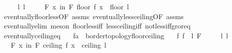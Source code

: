 \begin{isabellebody}
\ \ \ \ \ l{\isacharcolon}{\kern0pt}\ {\isachardoublequoteopen}l\ {\isasymnotin}\ {\isasymint}{\isachardoublequoteclose}\isanewline
\ \ \ {\isachardoublequoteopen}{\isasymforall}\isactrlsub F\ x\ in\ F{\isachardot}{\kern0pt}\ floor\ {\isacharparenleft}{\kern0pt}f\ x{\isacharparenright}{\kern0pt}\ {\isacharequal}{\kern0pt}\ floor\ l{\isachardoublequoteclose}\isanewline
%
\isadelimproof
\ \ %
\endisadelimproof
%
\isatagproof
{}\isamarkupfalse%
\ eventually{\isacharunderscore}{\kern0pt}floor{\isacharunderscore}{\kern0pt}less{\isacharbrackleft}{\kern0pt}OF\ assms{\isacharbrackright}{\kern0pt}\ eventually{\isacharunderscore}{\kern0pt}less{\isacharunderscore}{\kern0pt}ceiling{\isacharbrackleft}{\kern0pt}OF\ assms{\isacharbrackright}{\kern0pt}\isanewline
\ \ \isamarkupfalse%
\ eventually{\isacharunderscore}{\kern0pt}elim\ {\isacharparenleft}{\kern0pt}meson\ floor{\isacharunderscore}{\kern0pt}less{\isacharunderscore}{\kern0pt}iff\ less{\isacharunderscore}{\kern0pt}ceiling{\isacharunderscore}{\kern0pt}iff\ not{\isacharunderscore}{\kern0pt}less{\isacharunderscore}{\kern0pt}iff{\isacharunderscore}{\kern0pt}gr{\isacharunderscore}{\kern0pt}or{\isacharunderscore}{\kern0pt}eq{\isacharparenright}{\kern0pt}%
\endisatagproof
{\isafoldproof}%
%
\isadelimproof
\isanewline
%
\endisadelimproof
\isanewline
{}\isamarkupfalse%
\ eventually{\isacharunderscore}{\kern0pt}ceiling{\isacharunderscore}{\kern0pt}eq{\isacharcolon}{\kern0pt}\isanewline
\ \ \ f{\isacharcolon}{\kern0pt}{\isacharcolon}{\kern0pt}{\isachardoublequoteopen}{\isacharprime}{\kern0pt}a\ {\isasymRightarrow}\ {\isacharprime}{\kern0pt}b{\isacharcolon}{\kern0pt}{\isacharcolon}{\kern0pt}{\isacharbraceleft}{\kern0pt}order{\isacharunderscore}{\kern0pt}topology{\isacharcomma}{\kern0pt}floor{\isacharunderscore}{\kern0pt}ceiling{\isacharbraceright}{\kern0pt}{\isachardoublequoteclose}\isanewline
\ \ \ f{\isacharcolon}{\kern0pt}\ {\isachardoublequoteopen}{\isacharparenleft}{\kern0pt}f\ {\isasymlonglongrightarrow}\ l{\isacharparenright}{\kern0pt}\ F{\isachardoublequoteclose}\isanewline
\ \ \ \ \ l{\isacharcolon}{\kern0pt}\ {\isachardoublequoteopen}l\ {\isasymnotin}\ {\isasymint}{\isachardoublequoteclose}\isanewline
\ \ \ {\isachardoublequoteopen}{\isasymforall}\isactrlsub F\ x\ in\ F{\isachardot}{\kern0pt}\ ceiling\ {\isacharparenleft}{\kern0pt}f\ x{\isacharparenright}{\kern0pt}\ {\isacharequal}{\kern0pt}\ ceiling\ l{\isachardoublequoteclose}\isanewline
%
\isadelimproof
\ \ %
\endisadelimproof

\end{isabellebody}
